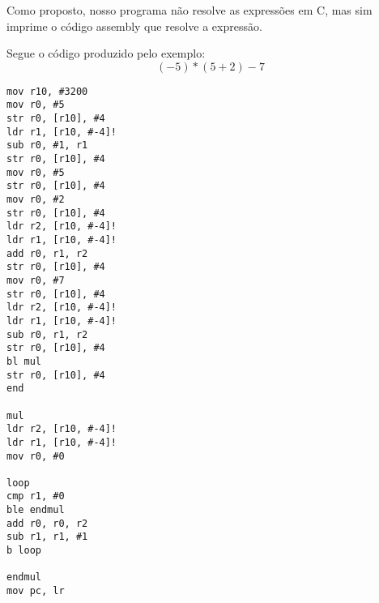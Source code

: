 \documentclass[a4paper, 10pt]{article}
\begin{document}
\begin{multicols*}{2}
Como proposto, nosso programa não resolve as expressões em C, mas sim imprime o código assembly que resolve a expressão.

Segue o código produzido pelo exemplo: $$(-5)*(5 + 2) - 7$$

\begin{multicols*}{2}

\begin{verbatim}
mov r10, #3200
mov r0, #5
str r0, [r10], #4
ldr r1, [r10, #-4]!
sub r0, #1, r1
str r0, [r10], #4
mov r0, #5
str r0, [r10], #4
mov r0, #2
str r0, [r10], #4
ldr r2, [r10, #-4]!
ldr r1, [r10, #-4]!
add r0, r1, r2
str r0, [r10], #4
mov r0, #7
str r0, [r10], #4
ldr r2, [r10, #-4]!
ldr r1, [r10, #-4]!
sub r0, r1, r2
str r0, [r10], #4
bl mul
str r0, [r10], #4
end

mul
ldr r2, [r10, #-4]!
ldr r1, [r10, #-4]!
mov r0, #0

loop
cmp r1, #0
ble endmul
add r0, r0, r2
sub r1, r1, #1
b loop

endmul
mov pc, lr

\end{verbatim}

\end{multicols*}

\end{multicols*}
\end{document}
